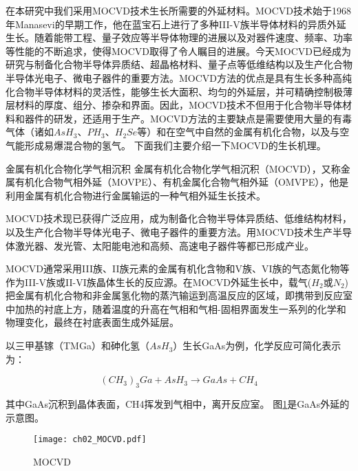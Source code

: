 在本研究中我们采用MOCVD技术生长所需要的外延材料。MOCVD技术始于1968年Manasevi的早期工作，他在蓝宝石上进行了多种III-V族半导体材料的异质外延生长\cite{epitaxial-growth.1}\cite{epitaxial-growth.2}\cite{epitaxial-growth.3}。随着能带工程、量子效应等半导体物理的进展以及对器件速度、频率、功率等性能的不断追求，使得MOCVD取得了令人瞩目的进展。今天MOCVD已经成为研究与制备化合物半导体异质结、超晶格材料、量子点等低维结构以及生产化合物半导体光电子、微电子器件的重要方法。MOCVD方法的优点是具有生长多种高纯化合物半导体材料的灵活性，能够生长大面积、均匀的外延层，并可精确控制极薄层材料的厚度、组分、掺杂和界面。因此，MOCVD技术不但用于化合物半导体材料和器件的研发，还适用于生产。MOCVD方法的主要缺点是需要使用大量的有毒气体（诸如$AsH_3$、$PH_3$、$H_2Se$等）和在空气中自然的金属有机化合物，以及与空气能形成易爆混合物的氢气。
下面我们主要介绍一下MOCVD的生长机理。

{\hei 金属有机化合物化学气相沉积}
金属有机化合物化学气相沉积（MOCVD），又称金属有机化合物气相外延（MOVPE）、有机金属化合物气相外延（OMVPE），他是利用金属有机化合物进行金属输运的一种气相外延生长技术\cite{Wang2005}。

MOCVD技术现已获得广泛应用，成为制备化合物半导体异质结、低维结构材料，以及生产化合物半导体光电子、微电子器件的重要方法。用MOCVD技术生产半导体激光器、发光管、太阳能电池和高频、高速电子器件等都已形成产业。

MOCVD通常采用III族、II族元素的金属有机化含物和V族、VI族的气态氮化物等作为III-V族或II-VI族晶体生长的反应源。在MOCVD外延生长中，载气($H_2$或$N_2$)把金属有机化合物和非金属氢化物的蒸汽输运到高温反应的区域，即携带到反应室中加热的衬底上方，随着温度的升高在气相和气相-固相界面发生一系列的化学和物理变化，最终在衬底表面生成外延层。

以三甲基镓（TMGa）和砷化氢（$AsH_3$）生长GaAs为例，化学反应可简化表示为：

\begin{equation}
	\label{eq:GaAsGrowth}
	(CH_3)_3Ga + AsH_3 \rightarrow GaAs + CH_4
\end{equation}


其中GaAs沉积到晶体表面，CH4挥发到气相中，离开反应室。
图\ref{fig:mocvd}是GaAs外延的示意图。

\begin{figure}[h]
	\centering
	\texttt{[image: ch02\_MOCVD.pdf]}
	\caption{MOCVD}
	\label{fig:mocvd}
\end{figure}


